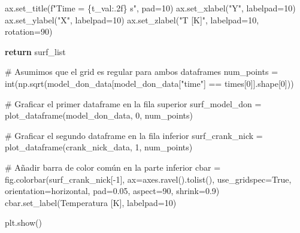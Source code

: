 \documentclass[
  spanish,
  us-letterpaper,
  DIV=11,
  numbers=noendperiod]{scrreprt}
\newenvironment{Shaded}{\begin{snugshade}}{\end{snugshade}}
\newcommand{\BuiltInTok}[1]{\textcolor[rgb]{0.00,0.23,0.31}{#1}}
\newcommand{\CommentTok}[1]{\textcolor[rgb]{0.37,0.37,0.37}{#1}}
\newcommand{\ControlFlowTok}[1]{\textcolor[rgb]{0.00,0.23,0.31}{\textbf{#1}}}
\newcommand{\DecValTok}[1]{\textcolor[rgb]{0.68,0.00,0.00}{#1}}
\newcommand{\FloatTok}[1]{\textcolor[rgb]{0.68,0.00,0.00}{#1}}
\newcommand{\NormalTok}[1]{\textcolor[rgb]{0.00,0.23,0.31}{#1}}
\newcommand{\OperatorTok}[1]{\textcolor[rgb]{0.37,0.37,0.37}{#1}}
\newcommand{\SpecialCharTok}[1]{\textcolor[rgb]{0.37,0.37,0.37}{#1}}
\newcommand{\SpecialStringTok}[1]{\textcolor[rgb]{0.13,0.47,0.30}{#1}}
\newcommand{\StringTok}[1]{\textcolor[rgb]{0.13,0.47,0.30}{#1}}
\newcommand{\VariableTok}[1]{\textcolor[rgb]{0.07,0.07,0.07}{#1}}
\theoremstyle{definition}
\theoremstyle{plain}
\theoremstyle{remark}
\begin{document}
\begin{Shaded}
\begin{Highlighting}[]
\NormalTok{        ax.set\_title(}\SpecialStringTok{f"Time = }\SpecialCharTok{\{}\NormalTok{t\_val}\SpecialCharTok{:.2f\}}\SpecialStringTok{ s"}\NormalTok{, pad}\OperatorTok{=}\DecValTok{10}\NormalTok{)}
\NormalTok{        ax.set\_xlabel(}\StringTok{"Y"}\NormalTok{, labelpad}\OperatorTok{=}\DecValTok{10}\NormalTok{)}
\NormalTok{        ax.set\_ylabel(}\StringTok{"X"}\NormalTok{, labelpad}\OperatorTok{=}\DecValTok{10}\NormalTok{)}
\NormalTok{        ax.set\_zlabel(}\StringTok{"T [K]"}\NormalTok{, labelpad}\OperatorTok{=}\DecValTok{10}\NormalTok{, rotation}\OperatorTok{=}\DecValTok{90}\NormalTok{)}
    
    \ControlFlowTok{return}\NormalTok{ surf\_list}

\CommentTok{\# Asumimos que el grid es regular para ambos dataframes}
\NormalTok{num\_points }\OperatorTok{=} \BuiltInTok{int}\NormalTok{(np.sqrt(model\_don\_data[model\_don\_data[}\StringTok{"time"}\NormalTok{] }\OperatorTok{==}\NormalTok{ times[}\DecValTok{0}\NormalTok{]].shape[}\DecValTok{0}\NormalTok{]))}

\CommentTok{\# Graficar el primer dataframe en la fila superior}
\NormalTok{surf\_model\_don }\OperatorTok{=}\NormalTok{ plot\_dataframe(model\_don\_data, }\DecValTok{0}\NormalTok{, num\_points)}

\CommentTok{\# Graficar el segundo dataframe en la fila inferior}
\NormalTok{surf\_crank\_nick }\OperatorTok{=}\NormalTok{ plot\_dataframe(crank\_nick\_data, }\DecValTok{1}\NormalTok{, num\_points)}

\CommentTok{\# Añadir barra de color común en la parte inferior}
\NormalTok{cbar }\OperatorTok{=}\NormalTok{ fig.colorbar(surf\_crank\_nick[}\OperatorTok{{-}}\DecValTok{1}\NormalTok{], ax}\OperatorTok{=}\NormalTok{axes.ravel().tolist(),}
\NormalTok{                    use\_gridspec}\OperatorTok{=}\VariableTok{True}\NormalTok{, orientation}\OperatorTok{=}\StringTok{\textquotesingle{}horizontal\textquotesingle{}}\NormalTok{,}
\NormalTok{                    pad}\OperatorTok{=}\FloatTok{0.05}\NormalTok{, aspect}\OperatorTok{=}\DecValTok{90}\NormalTok{, shrink}\OperatorTok{=}\FloatTok{0.9}\NormalTok{)}
\NormalTok{cbar.set\_label(}\StringTok{\textquotesingle{}Temperatura [K]\textquotesingle{}}\NormalTok{, labelpad}\OperatorTok{=}\DecValTok{10}\NormalTok{)}


\NormalTok{plt.show()}
\end{Highlighting}
\end{Shaded}
\end{document}
